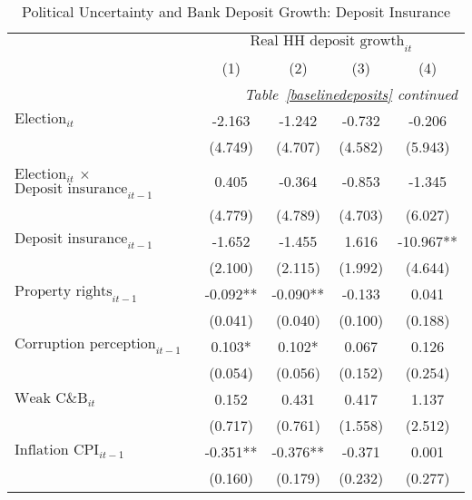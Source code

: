 \begin{longtable}{m{8cm}*{4}{c}}                                         \caption{Political Uncertainty and Bank Deposit Growth: Deposit Insurance \label{dideposits}}\\                                         \toprule                                         &\multicolumn{4}{c}{$\text{Real HH deposit growth}_{it}$} \\ \cmidrule(lr){2-5}
                    &         (1)   &         (2)   &         (3)   &         (4)   \\
\midrule\endfirsthead                                         \multicolumn{5}{r}{\textit{Table~\ref{baselinedeposits} continued}} \\                                         \toprule\endhead\midrule\endfoot\endlastfoot
$\text{Election}_{it}$&      -2.163   &      -1.242   &      -0.732   &      -0.206   \\
                    &     (4.749)   &     (4.707)   &     (4.582)   &     (5.943)   \\
$\text{Election}_{it}$ $\times$ $\text{Deposit insurance}_{it-1}$&       0.405   &      -0.364   &      -0.853   &      -1.345   \\
                    &     (4.779)   &     (4.789)   &     (4.703)   &     (6.027)   \\
$\text{Deposit insurance}_{it-1}$&      -1.652   &      -1.455   &       1.616   &     -10.967** \\
                    &     (2.100)   &     (2.115)   &     (1.992)   &     (4.644)   \\
$\text{Property rights}_{it-1}$&      -0.092** &      -0.090** &      -0.133   &       0.041   \\
                    &     (0.041)   &     (0.040)   &     (0.100)   &     (0.188)   \\
$\text{Corruption perception}_{it-1}$&       0.103*  &       0.102*  &       0.067   &       0.126   \\
                    &     (0.054)   &     (0.056)   &     (0.152)   &     (0.254)   \\
$\text{Weak C\&B}_{it}$&       0.152   &       0.431   &       0.417   &       1.137   \\
                    &     (0.717)   &     (0.761)   &     (1.558)   &     (2.512)   \\
$\text{Inflation CPI}_{it-1}$&      -0.351** &      -0.376** &      -0.371   &       0.001   \\
                    &     (0.160)   &     (0.179)   &     (0.232)   &     (0.277)   \\

\end{longtable}
